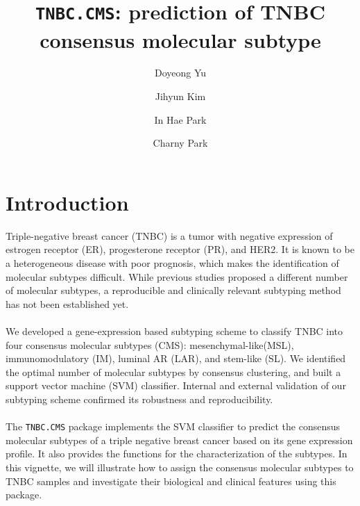 \documentclass{article}\usepackage[]{graphicx}\usepackage[]{color}
\begin{document}
\title{\texttt{TNBC.CMS}: prediction of TNBC consensus molecular subtype}

\author[1]{Doyeong Yu}
\author[1]{Jihyun Kim}
\author[2]{In Hae Park}
\author[1]{Charny Park}


\maketitle
\tableofcontents
\pagebreak
\section{Introduction}
Triple-negative breast cancer (TNBC) is a tumor with negative expression of estrogen receptor (ER), progesterone receptor (PR), and HER2. It is known to be a heterogeneous disease with poor prognosis, which makes the identification of molecular subtypes difficult. While previous studies proposed a different number of molecular subtypes, a reproducible and clinically relevant subtyping method has not been established yet.\paragraph{}
We developed a gene-expression based subtyping scheme to classify TNBC into four consensus molecular subtypes (CMS): mesenchymal-like(MSL), immunomodulatory (IM), luminal AR (LAR), and stem-like (SL). We identified the optimal number of molecular subtypes by consensus clustering, and built a support vector machine (SVM) classifier. Internal and external validation of our subtyping scheme confirmed its robustness and reproducibility.\paragraph{}
The \texttt{TNBC.CMS} package implements the SVM classifier to predict the consensus molecular subtypes of a triple negative breast cancer based on its gene expression profile. It also provides the functions for the characterization of the subtypes. In this vignette, we will illustrate how to assign the consensus molecular subtypes to TNBC samples and investigate their biological and clinical features using this package.
\end{document}
